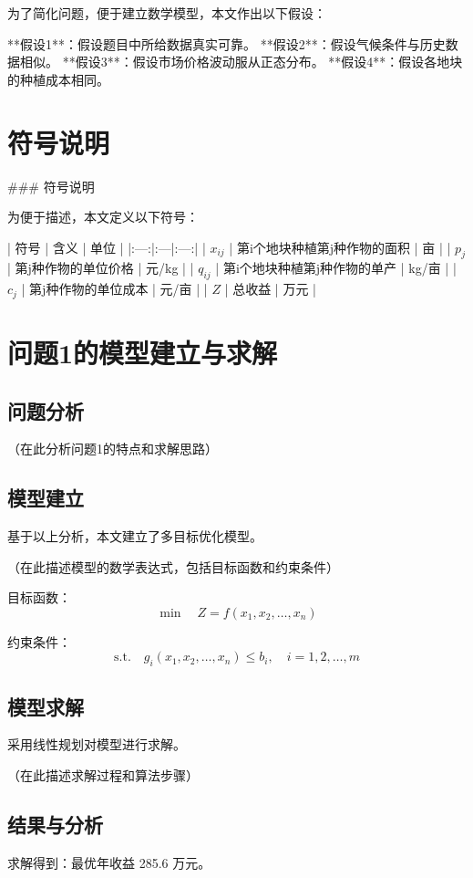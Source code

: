 \documentclass[12pt,a4paper]{article}
\begin{document}
为了简化问题，便于建立数学模型，本文作出以下假设：

**假设1**：假设题目中所给数据真实可靠。
**假设2**：假设气候条件与历史数据相似。
**假设3**：假设市场价格波动服从正态分布。
**假设4**：假设各地块的种植成本相同。


\section{符号说明}
### 符号说明

为便于描述，本文定义以下符号：

| 符号 | 含义 | 单位 |
|:---:|:---|:---:|
| $x_{ij}$ | 第i个地块种植第j种作物的面积 | 亩 |
| $p_j$ | 第j种作物的单位价格 | 元/kg |
| $q_{ij}$ | 第i个地块种植第j种作物的单产 | kg/亩 |
| $c_j$ | 第j种作物的单位成本 | 元/亩 |
| $Z$ | 总收益 | 万元 |


\section{问题1的模型建立与求解}
\subsection{问题分析}
（在此分析问题1的特点和求解思路）

\subsection{模型建立}
基于以上分析，本文建立了多目标优化模型。

（在此描述模型的数学表达式，包括目标函数和约束条件）

目标函数：
\begin{equation}
\min \quad Z = f(x_1, x_2, \ldots, x_n)
\end{equation}

约束条件：
\begin{equation}
\text{s.t.} \quad g_i(x_1, x_2, \ldots, x_n) \leq b_i, \quad i = 1, 2, \ldots, m
\end{equation}

\subsection{模型求解}
采用线性规划对模型进行求解。

（在此描述求解过程和算法步骤）

\subsection{结果与分析}
求解得到：最优年收益 285.6 万元。
\end{document}
